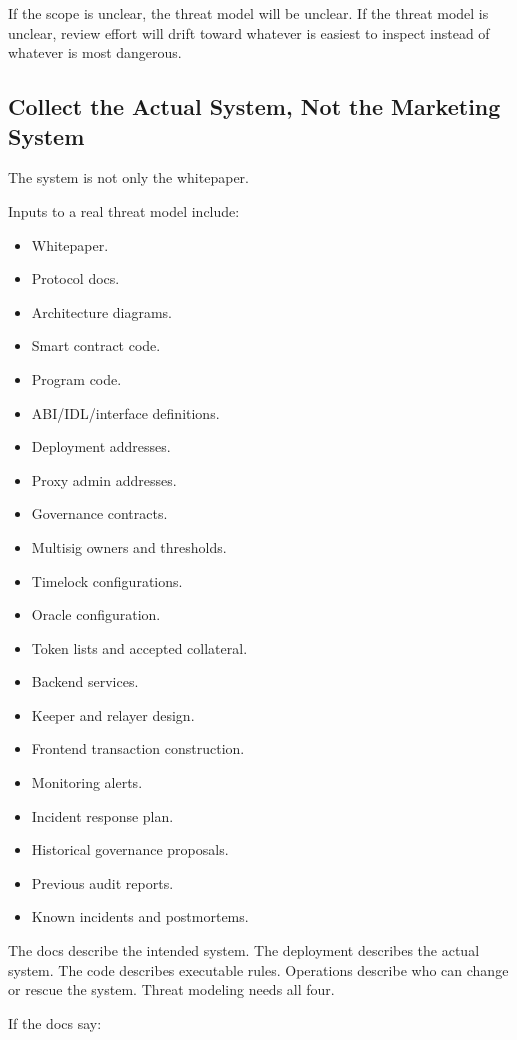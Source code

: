 If the scope is unclear, the threat model will be unclear. If the threat
model is unclear, review effort will drift toward whatever is easiest to
inspect instead of whatever is most dangerous.

\subsection{Collect the Actual System, Not the Marketing System}

The system is not only the whitepaper.

Inputs to a real threat model include:

\begin{itemize}
\tightlist
\item
  Whitepaper.
\item
  Protocol docs.
\item
  Architecture diagrams.
\item
  Smart contract code.
\item
  Program code.
\item
  ABI/IDL/interface definitions.
\item
  Deployment addresses.
\item
  Proxy admin addresses.
\item
  Governance contracts.
\item
  Multisig owners and thresholds.
\item
  Timelock configurations.
\item
  Oracle configuration.
\item
  Token lists and accepted collateral.
\item
  Backend services.
\item
  Keeper and relayer design.
\item
  Frontend transaction construction.
\item
  Monitoring alerts.
\item
  Incident response plan.
\item
  Historical governance proposals.
\item
  Previous audit reports.
\item
  Known incidents and postmortems.
\end{itemize}

The docs describe the intended system. The deployment describes the
actual system. The code describes executable rules. Operations describe
who can change or rescue the system. Threat modeling needs all four.

If the docs say:

